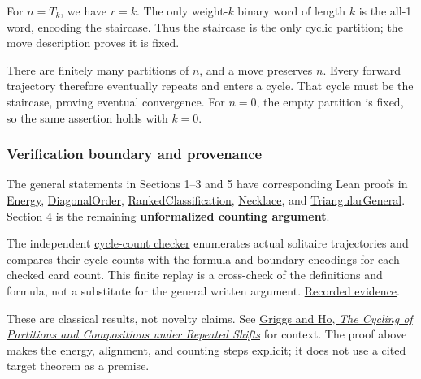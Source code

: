 \documentclass[11pt,a4paper]{article}
\begin{document}
For \(n=T_k\), we have \(r=k\). The only weight-\(k\) binary word of length \(k\) is the all-1 word, encoding the staircase. Thus the staircase is the only cyclic partition; the move description proves it is fixed.

There are finitely many partitions of \(n\), and a move preserves \(n\). Every forward trajectory therefore eventually repeats and enters a cycle. That cycle must be the staircase, proving eventual convergence. For \(n=0\), the empty partition is fixed, so the same assertion holds with \(k=0\).

\subsubsection{Verification boundary and provenance}\label{verification-boundary-and-provenance}

The general statements in Sections 1--3 and 5 have corresponding Lean proofs in \href{https://github.com/mpelteshki/climbing-to-the-frontier/blob/212bba53b1818c08c40b8c4b48f636651eaf6410/cagent/p3/lean/ProofPursuit/P3/Energy.lean}{Energy}, \href{https://github.com/mpelteshki/climbing-to-the-frontier/blob/212bba53b1818c08c40b8c4b48f636651eaf6410/cagent/p3/lean/ProofPursuit/P3/DiagonalOrder.lean}{DiagonalOrder}, \href{https://github.com/mpelteshki/climbing-to-the-frontier/blob/212bba53b1818c08c40b8c4b48f636651eaf6410/cagent/p3/lean/ProofPursuit/P3/RankedClassification.lean}{RankedClassification}, \href{https://github.com/mpelteshki/climbing-to-the-frontier/blob/212bba53b1818c08c40b8c4b48f636651eaf6410/cagent/p3/lean/ProofPursuit/P3/Necklace.lean}{Necklace}, and \href{https://github.com/mpelteshki/climbing-to-the-frontier/blob/212bba53b1818c08c40b8c4b48f636651eaf6410/cagent/p3/lean/ProofPursuit/P3/TriangularGeneral.lean}{TriangularGeneral}. Section 4 is the remaining \textbf{unformalized counting argument}.

The independent \href{https://github.com/mpelteshki/climbing-to-the-frontier/blob/212bba53b1818c08c40b8c4b48f636651eaf6410/cagent/p3/c1/check_cycles.py}{cycle-count checker} enumerates actual solitaire trajectories and compares their cycle counts with the formula and boundary encodings for each checked card count. This finite replay is a cross-check of the definitions and formula, not a substitute for the general written argument. \href{https://github.com/mpelteshki/climbing-to-the-frontier/blob/212bba53b1818c08c40b8c4b48f636651eaf6410/cagent/p3/evidence/cycle-counts.json}{Recorded evidence}.

These are classical results, not novelty claims. See \href{https://sc.edu/study/colleges_schools/artsandsciences/mathematics/research/imi/research/documents/1998/1998_12.pdf}{Griggs and Ho, \emph{The Cycling of Partitions and Compositions under Repeated Shifts}} for context. The proof above makes the energy, alignment, and counting steps explicit; it does not use a cited target theorem as a premise.
\end{document}
